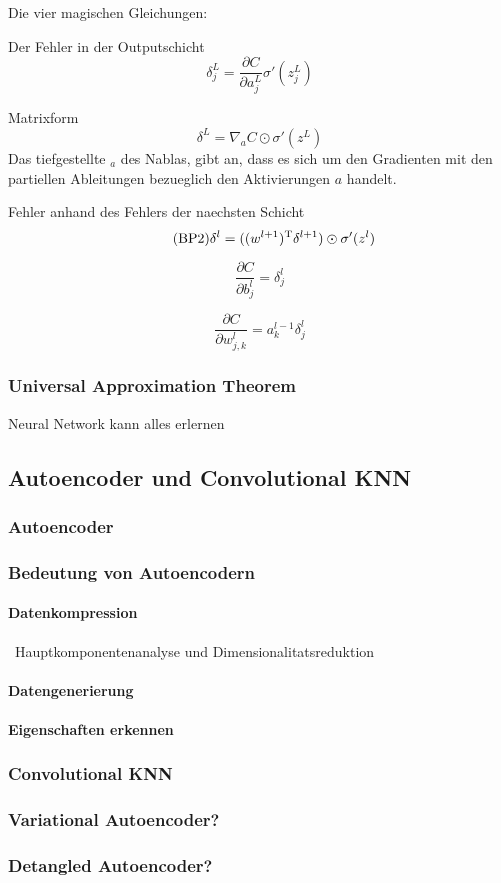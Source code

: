 \documentclass[../main]{subfiles}
\begin{document}
Die vier magischen Gleichungen:

Der Fehler in der Outputschicht
\begin{equation}\tag{BP1}
  \delta_j^L = \frac{\partial C}{\partial a_j^L} \sigma'(z_j^L)
\end{equation}

Matrixform
\begin{equation}\tag{BP1a}
  \delta^L = \nabla_aC \odot \sigma'(z^L)
\end{equation}
Das tiefgestellte $_a$ des Nablas, gibt an, dass es sich um den Gradienten mit den partiellen
Ableitungen bezueglich den Aktivierungen $a$ handelt.

Fehler anhand des Fehlers der naechsten Schicht
\begin{equation}\tag{BP2}
  \delta^l = ((w^{l+1})^\mathrm{T} \delta^{l+1}) \odot \sigma'(z^l)
\end{equation}

\begin{equation}\tag{BP3}
  \frac{\partial C}{\partial b_j^l} = \delta_j^l
\end{equation}

\begin{equation}\tag{BP4}
  \frac{\partial C}{\partial w_{j,k}^l} = a_k^{l-1} \delta_j^l
\end{equation}



\subsubsection{Universal Approximation Theorem}\label{sec:UAT}
Neural Network kann alles erlernen

\subsection{Autoencoder und Convolutional KNN}
\subsubsection{Autoencoder}
\subsubsection{Bedeutung von Autoencodern}
\paragraph{Datenkompression}
~Hauptkomponentenanalyse und Dimensionalitatsreduktion
\paragraph{Datengenerierung}
\paragraph{Eigenschaften erkennen}

\subsubsection{Convolutional KNN}

\subsubsection{Variational Autoencoder?}
\subsubsection{Detangled Autoencoder?}
\end{document}
